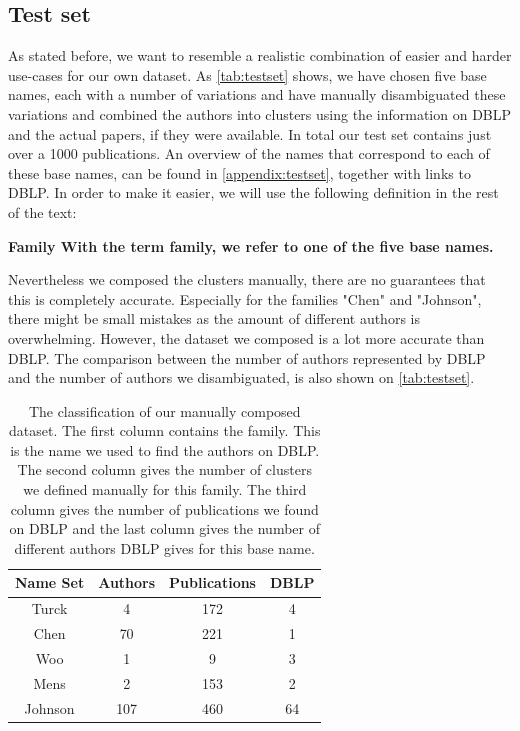 \subsection{Test set}
\label{sec:testset}

As stated before, we want to resemble a realistic combination of easier and harder use-cases for our own dataset. As \autoref{tab:testset} shows, we have chosen five base names, each with a number of variations and have manually disambiguated these variations and combined the authors into clusters using the information on DBLP and the actual papers, if they were available. In total our test set contains just over a 1000 publications. An overview of the names that correspond to each of these base names, can be found in \autoref{appendix:testset}, together with links to DBLP. In order to make it easier, we will use the following definition in the rest of the text:

\begin{mydef}
	\bfseries{Family} With the term family, we refer to one of the five base names.
\end{mydef}

Nevertheless we composed the clusters manually, there are no guarantees that this is completely accurate. Especially for the families "Chen" and "Johnson", there might be small mistakes as the amount of different authors is overwhelming. However, the dataset we composed is a lot more accurate than DBLP. The comparison between the number of authors represented by DBLP and the number of authors we disambiguated, is also shown on \autoref{tab:testset}.

\begin{table}
	\centering
		\begin{tabular}[ht]{|c|c|c|c|}
			\hline
			\bfseries{Name Set} & \bfseries{Authors} & \bfseries{Publications} & \bfseries{DBLP} \\
			\hline
			Turck & 4 & 172 & 4 \\
			\hline
			Chen & 70 & 221 & 1 \\
			\hline
			Woo & 1 & 9 & 3 \\
			\hline
			Mens & 2 & 153 & 2 \\
			\hline
			Johnson & 107 & 460 & 64 \\
			\hline
		\end{tabular}
	\caption{The classification of our manually composed dataset. The first column contains the family. This is the name we used to find the authors on DBLP. The second column gives the number of clusters we defined manually for this family. The third column gives the number of publications we found on DBLP and the last column gives the number of different authors DBLP gives for this base name.}
	\label{tab:testset}
\end{table}

